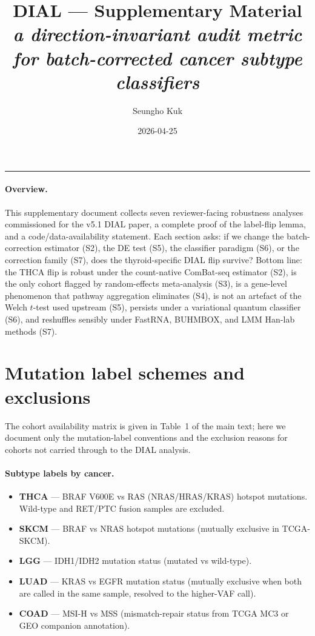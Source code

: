 \documentclass[11pt,a4paper]{article}
\title{DIAL --- Supplementary Material \\
\large \textit{a direction-invariant audit metric for batch-corrected
cancer subtype classifiers}}
\author{Seungho Kuk}
\date{2026-04-25}
\begin{document}
\maketitle
\tableofcontents
\vspace{1em}\hrule\vspace{1em}

\paragraph{Overview.} This supplementary document collects seven
reviewer-facing robustness analyses commissioned for the v5.1 DIAL
paper, a complete proof of the label-flip lemma, and a
code/data-availability statement. Each section asks: if we change the
batch-correction estimator (S2), the DE test (S5), the classifier
paradigm (S6), or the correction family (S7), does the thyroid-specific
DIAL flip survive? Bottom line: the THCA flip is robust under the
count-native ComBat-seq estimator (S2), is the only cohort flagged by
random-effects meta-analysis (S3), is a gene-level phenomenon that
pathway aggregation eliminates (S4), is not an artefact of the Welch
$t$-test used upstream (S5), persists under a variational quantum
classifier (S6), and reshuffles sensibly under FastRNA, BUHMBOX, and
LMM Han-lab methods (S7).

\section{Mutation label schemes and exclusions}
\label{sec:S1}

The cohort availability matrix is given in Table~1 of the main text;
here we document only the mutation-label conventions and the
exclusion reasons for cohorts not carried through to the DIAL
analysis.

\paragraph{Subtype labels by cancer.}
\begin{itemize}
\item \textbf{THCA} --- BRAF V600E vs RAS (NRAS/HRAS/KRAS) hotspot
  mutations. Wild-type and RET/PTC fusion samples are excluded.
\item \textbf{SKCM} --- BRAF vs NRAS hotspot mutations (mutually
  exclusive in TCGA-SKCM).
\item \textbf{LGG} --- IDH1/IDH2 mutation status (mutated vs
  wild-type).
\item \textbf{LUAD} --- KRAS vs EGFR mutation status (mutually
  exclusive when both are called in the same sample, resolved to the
  higher-VAF call).
\item \textbf{COAD} --- MSI-H vs MSS (mismatch-repair status from
  TCGA MC3 or GEO companion annotation).
\end{itemize}
\end{document}

